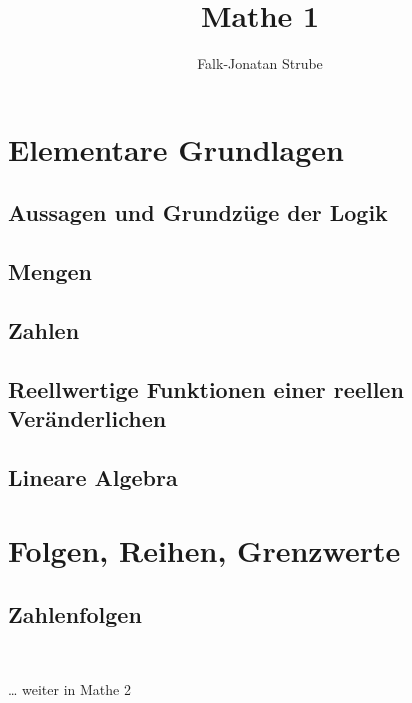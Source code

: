 \documentclass{scrreprt}
\title{Mathe 1}
\author{Falk-Jonatan Strube}
\begin{document}
\maketitle
\tableofcontents

\chapter{Elementare Grundlagen}

\section{Aussagen und Grundzüge der Logik}


\section{Mengen}\label{sec:Mengen}


\section{Zahlen}


\section{Reellwertige Funktionen einer reellen Veränderlichen}


\section{Lineare Algebra}


\chapter{Folgen, Reihen, Grenzwerte}
\section{Zahlenfolgen}

\\
\begin{Huge}
… weiter in Mathe 2
\end{Huge}
\end{document}
